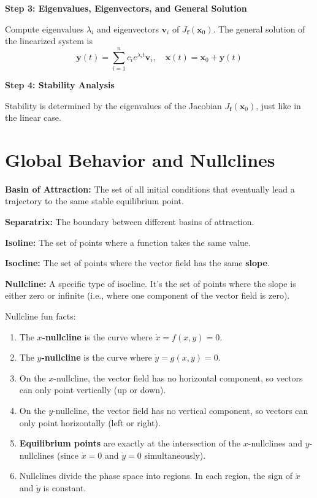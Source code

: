 \textbf{Step 3: Eigenvalues, Eigenvectors, and General Solution}

Compute eigenvalues $\lambda_i$ and eigenvectors $\mathbf{v}_i$ of $J_{\mathbf{f}}(\mathbf{x}_0)$.
The general solution of the linearized system is
\[
\mathbf{y}(t) = \sum_{i=1}^n c_i e^{\lambda_i t} \mathbf{v}_i, \quad
\mathbf{x}(t) = \mathbf{x}_0 + \mathbf{y}(t)
\]

\textbf{Step 4: Stability Analysis}

Stability is determined by the eigenvalues of the Jacobian $J_{\mathbf{f}}(\mathbf{x}_0)$, just like in the linear case.

\section*{Global Behavior and Nullclines}

\begin{tightitemize}
  \item \textbf{Basin of Attraction:} The set of all initial conditions that eventually lead a trajectory to the same stable equilibrium point.
  \item \textbf{Separatrix:} The boundary between different basins of attraction.
  \item \textbf{Isoline:} The set of points where a function takes the same value.
  \item \textbf{Isocline:} The set of points where the vector field has the same \textbf{slope}.
  \item \textbf{Nullcline:} A specific type of isocline. It's the set of points where the slope is either zero or infinite (i.e., where one component of the vector field is zero).
\end{tightitemize}

Nullcline fun facts:
\begin{enumerate}
  \item The \textbf{$x$-nullcline} is the curve where $\dot{x} = f(x,y) = 0$.
  \item The \textbf{$y$-nullcline} is the curve where $\dot{y} = g(x,y) = 0$.
  \item On the $x$-nullcline, the vector field has no horizontal component, so vectors can only point vertically (up or down).
  \item On the $y$-nullcline, the vector field has no vertical component, so vectors can only point horizontally (left or right).
  \item \textbf{Equilibrium points} are exactly at the intersection of the $x$-nullclines and $y$-nullclines (since $\dot{x}=0$ and $\dot{y}=0$ simultaneously).
  \item Nullclines divide the phase space into regions. In each region, the sign of $\dot{x}$ and $\dot{y}$ is constant.
\end{enumerate}

